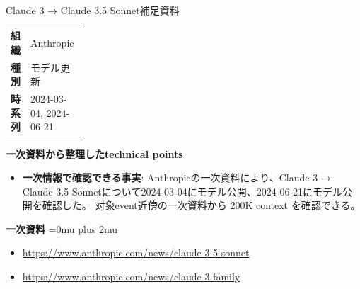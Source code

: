 \Needspace{0.38\textheight}
\begin{technicalnote}{Claude 3 → Claude 3.5 Sonnet}{補足資料}
\begingroup
\begin{tabularx}{\linewidth}{@{}>{\bfseries}p{0.22\linewidth}X@{}}
組織 & Anthropic \\
種別 & モデル更新 \\
時系列 & 2024-03-04, 2024-06-21 \\
\end{tabularx}
\smallskip
\begin{minipage}{\linewidth}
{\bfseries 一次資料から整理したtechnical points}
\begin{itemize}[leftmargin=1.5em,itemsep=0.35em]
\item \textbf{一次情報で確認できる事実}: Anthropicの一次資料により、Claude 3 → Claude 3.5 Sonnetについて2024-03-04にモデル公開、2024-06-21にモデル公開を確認した。 対象event近傍の一次資料から 200K context を確認できる。
\end{itemize}
\begin{minipage}{\linewidth}
\begin{samepage}
{\bfseries 一次資料}
\begingroup\sloppy
\Urlmuskip=0mu plus 2mu\relax
\begin{itemize}[leftmargin=1.5em,itemsep=0.25em]
\item {\scriptsize\url{https://www.anthropic.com/news/claude-3-5-sonnet}}
\item {\scriptsize\url{https://www.anthropic.com/news/claude-3-family}}
\end{itemize}
\endgroup
\end{samepage}
\end{minipage}
\end{minipage}
\endgroup
\end{technicalnote}
\medskip

